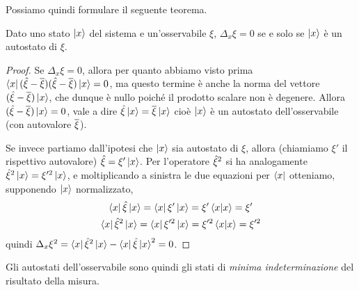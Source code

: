 Possiamo quindi formulare il seguente teorema.
\begin{teorema} \label{t:autostato-indeterminazione-nulla}
	Dato uno stato $\left|{x}\right\rangle$ del sistema e un'osservabile $\xi$, $\Delta_x\xi=0$ se e solo se $\left|{x}\right\rangle$ è un autostato di $\xi$.
\end{teorema}
\begin{proof}
	Se $\Delta_x\xi=0$, allora per quanto abbiamo visto prima $\left\langle{x}\right|(\hat{\xi}-\overline{\xi})(\hat{\xi}-\overline{\xi})\left|{x}\right\rangle=0$, ma questo termine è anche la norma del vettore $(\hat{\xi}-\overline{\xi})\left|{x}\right\rangle$, che dunque è nullo poich\'e il prodotto scalare non è degenere.
	Allora $(\hat{\xi}-\overline{\xi})\left|{x}\right\rangle=0$, vale a dire $\hat{\xi}\left|{x}\right\rangle=\overline{\xi}\left|{x}\right\rangle$ cioè $\left|{x}\right\rangle$ è un autostato dell'osservabile (con autovalore $\overline{\xi}$).

	Se invece partiamo dall'ipotesi che $\left|{x}\right\rangle$ sia autostato di $\xi$, allora (chiamiamo $\xi'$ il rispettivo autovalore) $\hat{\xi}=\xi'\left|{x}\right\rangle$.
	Per l'operatore $\hat{\xi}^2$ si ha analogamente $\hat{\xi}^2\left|{x}\right\rangle=\xi'^2\left|{x}\right\rangle$, e moltiplicando a sinistra le due equazioni per $\left\langle{x}\right|$ otteniamo, supponendo $\left|{x}\right\rangle$ normalizzato,
	\begin{gather}
		\left\langle{x}\right|\hat{\xi}\left|{x}\right\rangle=\left\langle{x}\right|\xi'\left|{x}\right\rangle=\xi'\left\langle{x}\middle|{x}\right\rangle=\xi'\\
		\left\langle{x}\right|\hat{\xi}^2\left|{x}\right\rangle=\left\langle{x}\right|\xi'^2\left|{x}\right\rangle=\xi'^2\left\langle{x}\middle|{x}\right\rangle=\xi'^2
	\end{gather}
	quindi $\Delta_x\xi^2=\left\langle{x}\right|\hat{\xi}^2\left|{x}\right\rangle-\left\langle{x}\right|\hat{\xi}\left|{x}\right\rangle^2=0$.
\end{proof}
Gli autostati dell'osservabile sono quindi gli stati di \emph{minima indeterminazione} del risultato della misura.


